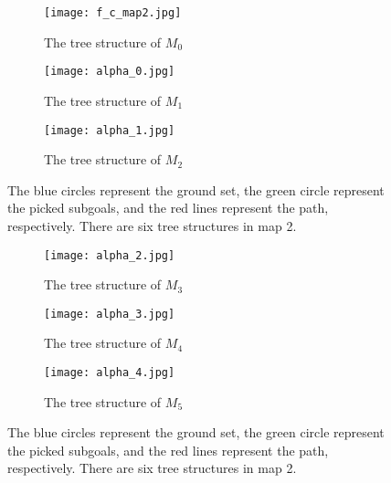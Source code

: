 \begin{figure}[htbp]
 \begin{center}
 \begin{subfigure}{.45\textwidth}
  \centering
  \texttt{[image: f\_c\_map2.jpg]}
  \caption{The tree structure of $M_0$}
\end{subfigure}
\begin{subfigure}{.45\textwidth}
  \centering
  \texttt{[image: alpha\_0.jpg]}
  \caption{The tree structure of $M_1$}
\end{subfigure}
\begin{subfigure}{.45\textwidth}
  \centering
  \texttt{[image: alpha\_1.jpg]}
  \caption{The tree structure of $M_2$}
\end{subfigure}
\caption{The blue circles represent the ground set, the green circle represent the picked subgoals, and the red lines represent the path, respectively. There are six tree structures in map 2.}
\end{center}
\end{figure}

\begin{figure}[htbp]
\ContinuedFloat
\begin{center}
\begin{subfigure}{.45\textwidth}
  \centering
  \texttt{[image: alpha\_2.jpg]}
  \caption{The tree structure of $M_3$}
\end{subfigure}
\begin{subfigure}{.45\textwidth}
  \centering
  \texttt{[image: alpha\_3.jpg]}
  \caption{The tree structure of $M_4$}
\end{subfigure}
\begin{subfigure}{.45\textwidth}
  \centering
  \texttt{[image: alpha\_4.jpg]}
  \caption{The tree structure of $M_5$}
\end{subfigure}
\caption{The blue circles represent the ground set, the green circle represent the picked subgoals, and the red lines represent the path, respectively. There are six tree structures in map 2.}
\label{fig:trees_map2}
 \end{center}
 \end{figure} 